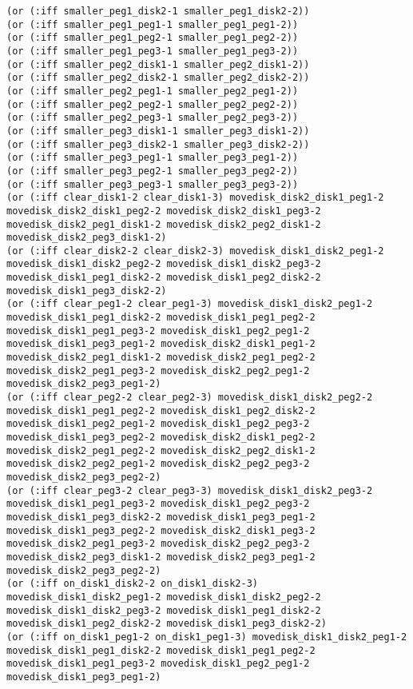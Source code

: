 \documentclass[12pt,letterpaper]{ntdhw}
\begin{document}
\begin{enumerate}
\begin{enumerate}
\begin{lstlisting}[language=pddl, style=pddlstyle,
  basicstyle=\scriptsize]
(or (:iff smaller_peg1_disk2-1 smaller_peg1_disk2-2))
(or (:iff smaller_peg1_peg1-1 smaller_peg1_peg1-2))
(or (:iff smaller_peg1_peg2-1 smaller_peg1_peg2-2))
(or (:iff smaller_peg1_peg3-1 smaller_peg1_peg3-2))
(or (:iff smaller_peg2_disk1-1 smaller_peg2_disk1-2))
(or (:iff smaller_peg2_disk2-1 smaller_peg2_disk2-2))
(or (:iff smaller_peg2_peg1-1 smaller_peg2_peg1-2))
(or (:iff smaller_peg2_peg2-1 smaller_peg2_peg2-2))
(or (:iff smaller_peg2_peg3-1 smaller_peg2_peg3-2))
(or (:iff smaller_peg3_disk1-1 smaller_peg3_disk1-2))
(or (:iff smaller_peg3_disk2-1 smaller_peg3_disk2-2))
(or (:iff smaller_peg3_peg1-1 smaller_peg3_peg1-2))
(or (:iff smaller_peg3_peg2-1 smaller_peg3_peg2-2))
(or (:iff smaller_peg3_peg3-1 smaller_peg3_peg3-2))
(or (:iff clear_disk1-2 clear_disk1-3) movedisk_disk2_disk1_peg1-2 movedisk_disk2_disk1_peg2-2 movedisk_disk2_disk1_peg3-2 movedisk_disk2_peg1_disk1-2 movedisk_disk2_peg2_disk1-2 movedisk_disk2_peg3_disk1-2)
(or (:iff clear_disk2-2 clear_disk2-3) movedisk_disk1_disk2_peg1-2 movedisk_disk1_disk2_peg2-2 movedisk_disk1_disk2_peg3-2 movedisk_disk1_peg1_disk2-2 movedisk_disk1_peg2_disk2-2 movedisk_disk1_peg3_disk2-2)
(or (:iff clear_peg1-2 clear_peg1-3) movedisk_disk1_disk2_peg1-2 movedisk_disk1_peg1_disk2-2 movedisk_disk1_peg1_peg2-2 movedisk_disk1_peg1_peg3-2 movedisk_disk1_peg2_peg1-2 movedisk_disk1_peg3_peg1-2 movedisk_disk2_disk1_peg1-2 movedisk_disk2_peg1_disk1-2 movedisk_disk2_peg1_peg2-2 movedisk_disk2_peg1_peg3-2 movedisk_disk2_peg2_peg1-2 movedisk_disk2_peg3_peg1-2)
(or (:iff clear_peg2-2 clear_peg2-3) movedisk_disk1_disk2_peg2-2 movedisk_disk1_peg1_peg2-2 movedisk_disk1_peg2_disk2-2 movedisk_disk1_peg2_peg1-2 movedisk_disk1_peg2_peg3-2 movedisk_disk1_peg3_peg2-2 movedisk_disk2_disk1_peg2-2 movedisk_disk2_peg1_peg2-2 movedisk_disk2_peg2_disk1-2 movedisk_disk2_peg2_peg1-2 movedisk_disk2_peg2_peg3-2 movedisk_disk2_peg3_peg2-2)
(or (:iff clear_peg3-2 clear_peg3-3) movedisk_disk1_disk2_peg3-2 movedisk_disk1_peg1_peg3-2 movedisk_disk1_peg2_peg3-2 movedisk_disk1_peg3_disk2-2 movedisk_disk1_peg3_peg1-2 movedisk_disk1_peg3_peg2-2 movedisk_disk2_disk1_peg3-2 movedisk_disk2_peg1_peg3-2 movedisk_disk2_peg2_peg3-2 movedisk_disk2_peg3_disk1-2 movedisk_disk2_peg3_peg1-2 movedisk_disk2_peg3_peg2-2)
(or (:iff on_disk1_disk2-2 on_disk1_disk2-3) movedisk_disk1_disk2_peg1-2 movedisk_disk1_disk2_peg2-2 movedisk_disk1_disk2_peg3-2 movedisk_disk1_peg1_disk2-2 movedisk_disk1_peg2_disk2-2 movedisk_disk1_peg3_disk2-2)
(or (:iff on_disk1_peg1-2 on_disk1_peg1-3) movedisk_disk1_disk2_peg1-2 movedisk_disk1_peg1_disk2-2 movedisk_disk1_peg1_peg2-2 movedisk_disk1_peg1_peg3-2 movedisk_disk1_peg2_peg1-2 movedisk_disk1_peg3_peg1-2)

\end{lstlisting}
\end{enumerate}
\end{enumerate}
\end{document}
